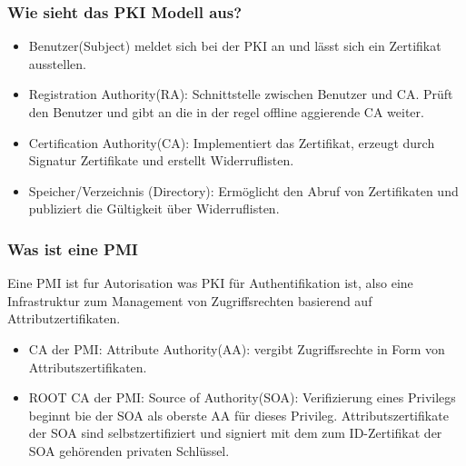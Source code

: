 	\subsubsection{Wie sieht das PKI Modell aus?}
	\begin{itemize}
		\item Benutzer(Subject) meldet sich bei der PKI an und lässt sich ein Zertifikat ausstellen.
		\item Registration Authority(RA): Schnittstelle zwischen Benutzer und CA. Prüft den Benutzer und gibt an die in der regel offline aggierende CA weiter.
		\item Certification Authority(CA): Implementiert das Zertifikat, erzeugt durch Signatur Zertifikate und erstellt Widerruflisten.
		\item Speicher/Verzeichnis (Directory): Ermöglicht den Abruf von Zertifikaten und publiziert die Gültigkeit über Widerruflisten.
	\end{itemize}
	
	\subsubsection{Was ist eine PMI}
	Eine PMI ist fur Autorisation was PKI für Authentifikation ist, also eine Infrastruktur zum Management von Zugriffsrechten basierend auf Attributzertifikaten.
	\begin{itemize}
		\item CA der PMI: Attribute Authority(AA): vergibt Zugriffsrechte in Form von Attributszertifikaten.
		\item ROOT CA der PMI: Source of Authority(SOA): Verifizierung eines Privilegs beginnt bie der SOA als oberste AA für dieses Privileg. Attributszertifikate der SOA sind selbstzertifiziert und signiert mit dem zum ID-Zertifikat der SOA gehörenden privaten Schlüssel.
	\end{itemize}
	
